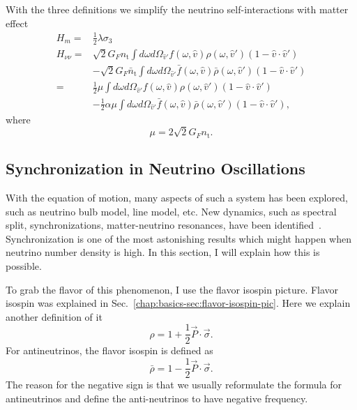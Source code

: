 With the three definitions we simplify the neutrino self-interactions with matter effect
\begin{align*}
   H_m =& \frac{1}{2} \lambda \sigma_3 \\
   H_{\nu\nu} =& \sqrt{2}G_F n_{\mathrm{t}} \int d\omega d\Omega_{\hat v'} f(\omega,\hat v)\rho(\omega,\hat v') (1-\hat v \cdot \hat v') \\
   & - \sqrt{2}G_F \bar n_{\mathrm{t}} \int d\omega d\Omega_{\hat v'} \bar f(\omega,\hat v)\bar\rho(\omega,\hat v') (1-\hat v \cdot \hat v') \\
   =& \frac{1}{2}\mu \int d\omega d\Omega_{\hat v'} f(\omega, \hat v)\rho(\omega,\hat v') (1-\hat v \cdot \hat v') \\
   & - \frac{1}{2}\alpha \mu \int d\omega d\Omega_{\hat v'} \bar f(\omega, \hat v)\bar\rho(\omega,\hat v') (1-\hat v \cdot \hat v') ,
\end{align*}
where
\begin{equation}
   \mu = 2\sqrt{2} G_F n_{\mathrm{t}}.
\end{equation}




\subsection{Synchronization in Neutrino Oscillations}


With the equation of motion, many aspects of such a system has been explored, such as neutrino bulb model, line model, etc. New dynamics, such as spectral split, synchronizations, matter-neutrino resonances, have been identified~\cite{Duan2006,Malkus2014,Vaananen2015}. Synchronization is one of the most astonishing results which might happen when neutrino number density is high. In this section, I will explain how this is possible.

To grab the flavor of this phenomenon, I use the flavor isospin picture. Flavor isospin was explained in Sec.~\ref{chap:basics-sec:flavor-isospin-pic}. Here we explain another definition of it
\begin{equation}
   \rho = 1 + \frac{1}{2}\vec P \cdot \vec \sigma.
\end{equation}
For antineutrinos, the flavor isospin is defined as
\begin{equation}
    \bar\rho = 1 - \frac{1}{2} \vec P \cdot \vec \sigma.
\end{equation}
The reason for the negative sign is that we usually reformulate the formula for antineutrinos and define the anti-neutrinos to have negative frequency.

